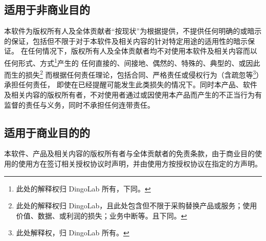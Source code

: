   \subsection{适用于非商业目的}
  本软件为版权所有人及全体贡献者“按现状”为根据提供，不提供任何明确的或暗示的保证，包括但不限于对于本软件及相关内容的针对特定用途的适用性的暗示保证。
  在任何情况下，版权所有人及全体贡献者均不对使用本软件及相关内容而以任何形式、方式\footnote{此处的解释权归 DingoLab 所有，下同。}产生的
  任何直接的、间接地、偶然的、特殊的、典型的、或因此而生的损失\footnote{此处的解释权归 DingoLab，且此处包含但不限于采购替换产品或服务；使用价值、数据、或利润的损失；业务中断等。且下同。}
  而根据任何责任理论，包括合同、严格责任或侵权行为（含疏忽等\footnote{此处解释权，归 DingoLab 所有。}）承担任何责任，
  即使在已经提醒可能发生此类损失的情况下。同时本产品、软件及相关内容的版权所有者，不对使用者通过或因使用本产品而产生的不正当行为有监督的责任与义务，同时不承担任何连带责任。
  \subsection{适用于商业目的的}
  本软件、产品及相关内容的版权所有者与全体贡献者的免责条款，由于商业目的使用的使用方在签订相关授权协议时声明，并由使用方按授权协议在指定的方声明。

